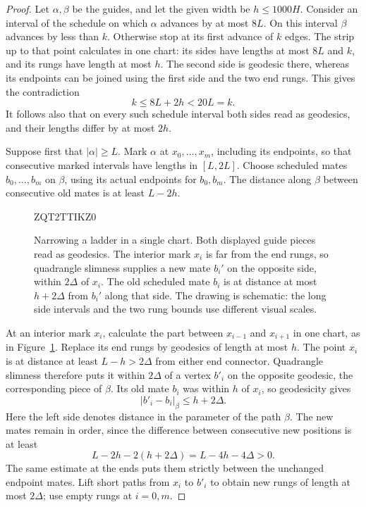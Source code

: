 \documentclass[11pt,reqno]{amsart}
\numberwithin{equation}{section}
\theoremstyle{definition}
\theoremstyle{remark}
\begin{document}
\begin{proof}
Let $\alpha,\beta$ be the guides, and let the given width be
$h\le1000H$.  Consider an interval of the schedule on which $\alpha$
advances by at most $8L$.  On this interval $\beta$ advances by less than
$k$.  Otherwise stop at its first advance of $k$ edges.  The strip up to
that point calculates in one chart: its sides have lengths at most
$8L$ and $k$, and its rungs have length at most $h$.  The second side is
geodesic there, whereas its endpoints can be joined using the first side
and the two end rungs.  This gives the contradiction
\[
 k\le8L+2h<20L=k.
\]
It follows also that on every such schedule interval both sides read as
geodesics, and their lengths differ by at most $2h$.

Suppose first that $|\alpha|\ge L$.  Mark $\alpha$ at
$x_0,\ldots,x_m$, including its endpoints, so that consecutive marked
intervals have lengths in $[L,2L]$.  Choose scheduled mates
$b_0,\ldots,b_m$ on $\beta$, using its actual endpoints for $b_0,b_m$.
The distance along $\beta$ between consecutive old mates is at least
$L-2h$.

\begin{figure}[htbp]

\begingroup
{}
ZQT2TTIKZ0
\endgroup
\caption{Narrowing a ladder in a single chart. Both displayed guide
  pieces read as geodesics. The interior mark $x_i$ is far from the
  end rungs, so quadrangle slimness supplies a new mate $b_i'$ on
  the opposite side, within $2\Delta$ of $x_i$. The old scheduled
  mate $b_i$ is at distance at most $h+2\Delta$ from $b_i'$ along
  that side. The drawing is
  schematic: the long side intervals and the two rung bounds use
  different visual scales.}
\label{fig:path-ladder}
\end{figure}


At an interior mark $x_i$, calculate the part between $x_{i-1}$ and
$x_{i+1}$ in one chart, as in Figure~\ref{fig:path-ladder}.
Replace its end rungs by geodesics of length at
most $h$.  The point $x_i$ is at distance at least $L-h>2\Delta$ from
either end connector.  Quadrangle slimness therefore puts it within
$2\Delta$ of a vertex $b'_i$ on the opposite geodesic, the corresponding
piece of $\beta$.  Its old mate $b_i$ was within $h$ of $x_i$, so
geodesicity gives
\begin{equation}\label{path:mate-shift}
 |b'_i-b_i|_{\beta}\le h+2\Delta.
\end{equation}
Here the left side denotes distance in the parameter of the path
$\beta$.  The new mates remain in order, since the difference between
consecutive new positions is at least
\[
 L-2h-2(h+2\Delta)=L-4h-4\Delta>0.
\]
The same estimate at the ends puts them strictly between the unchanged
endpoint mates.  Lift short paths from $x_i$ to $b'_i$ to obtain new
rungs of length at most $2\Delta$; use empty rungs at $i=0,m$.


\end{proof}
\end{document}
